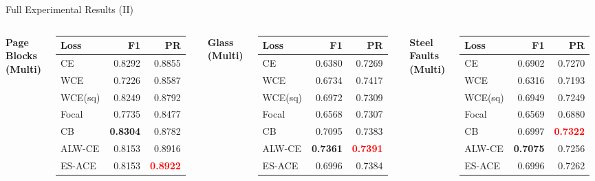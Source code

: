 \documentclass[aspectratio=169]{beamer}
\renewcommand{\textbf}[1]{\textcolor{SejongBlue}{\sf\bfseries #1}}
\begin{document}
\begin{frame}{Full Experimental Results (II)}
\begin{columns}[T, totalwidth=\textwidth]
\textbf{Page Blocks (Multi)}
\begin{tabular}{lrr}
\toprule
Loss & F1 & PR \\
\midrule
CE & 0.8292 & 0.8855 \\
WCE & 0.7226 & 0.8587 \\
WCE(sq) & 0.8249 & 0.8792 \\
Focal & 0.7735 & 0.8477 \\
CB & \textcolor{SejongBlue}{\textbf{0.8304}} & 0.8782 \\
\textcolor{SejongBlue}{ALW-CE} & 0.8153 & 0.8916 \\
\textcolor{SejongBlue}{ES-ACE} & 0.8153 & \textcolor{red}{\textbf{0.8922}} \\
\bottomrule
\end{tabular}

\vspace{0.8em}

\textbf{Glass (Multi)}
\begin{tabular}{lrr}
\toprule
Loss & F1 & PR \\
\midrule
CE & 0.6380 & 0.7269 \\
WCE & 0.6734 & 0.7417 \\
WCE(sq) & 0.6972 & 0.7309 \\
Focal & 0.6568 & 0.7307 \\
CB & 0.7095 & 0.7383 \\
\textcolor{SejongBlue}{ALW-CE} & \textcolor{SejongBlue}{\textbf{0.7361}} & \textcolor{red}{\textbf{0.7391}} \\
\textcolor{SejongBlue}{ES-ACE} & 0.6996 & 0.7384 \\
\bottomrule
\end{tabular}


\textbf{Steel Faults (Multi)}
\begin{tabular}{lrr}
\toprule
Loss & F1 & PR \\
\midrule
CE & 0.6902 & 0.7270 \\
WCE & 0.6316 & 0.7193 \\
WCE(sq) & 0.6949 & 0.7249 \\
Focal & 0.6569 & 0.6880 \\
CB & 0.6997 & \textcolor{red}{\textbf{0.7322}} \\
\textcolor{SejongBlue}{ALW-CE} & \textcolor{SejongBlue}{\textbf{0.7075}} & 0.7256 \\
\textcolor{SejongBlue}{ES-ACE} & 0.6996 & 0.7262 \\
\bottomrule
\end{tabular}

\end{columns}
\end{frame}
\end{document}
